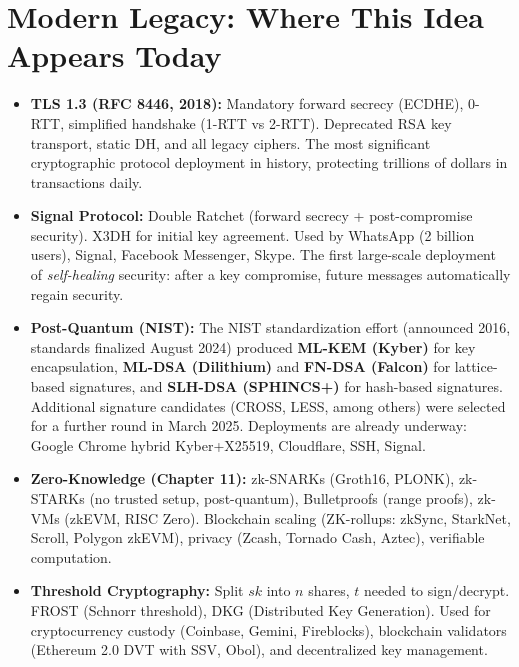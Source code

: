 \section{Modern Legacy: Where This Idea Appears Today}
\label{sec:crypto:legacy}

\begin{itemize}
\item \textbf{TLS 1.3 (RFC 8446, 2018):} Mandatory forward secrecy (ECDHE), 0-RTT, simplified handshake (1-RTT vs 2-RTT). Deprecated RSA key transport, static DH, and all legacy ciphers. The most significant cryptographic protocol deployment in history, protecting trillions of dollars in transactions daily.

\item \textbf{Signal Protocol:} Double Ratchet (forward secrecy + post-compromise security). X3DH for initial key agreement. Used by WhatsApp (2 billion users), Signal, Facebook Messenger, Skype. The first large-scale deployment of \emph{self-healing} security: after a key compromise, future messages automatically regain security.

\item \textbf{Post-Quantum (NIST):} The NIST standardization effort (announced 2016, standards finalized August 2024) produced \textbf{ML-KEM (Kyber)} for key encapsulation, \textbf{ML-DSA (Dilithium)} and \textbf{FN-DSA (Falcon)} for lattice-based signatures, and \textbf{SLH-DSA (SPHINCS+)} for hash-based signatures. Additional signature candidates (CROSS, LESS, among others) were selected for a further round in March 2025. Deployments are already underway: Google Chrome hybrid Kyber+X25519, Cloudflare, SSH, Signal.

\item \textbf{Zero-Knowledge (Chapter 11):} zk-SNARKs (Groth16, PLONK), zk-STARKs (no trusted setup, post-quantum), Bulletproofs (range proofs), zk-VMs (zkEVM, RISC Zero). Blockchain scaling (ZK-rollups: zkSync, StarkNet, Scroll, Polygon zkEVM), privacy (Zcash, Tornado Cash, Aztec), verifiable computation.

\item \textbf{Threshold Cryptography:} Split $sk$ into $n$ shares, $t$ needed to sign/decrypt. FROST (Schnorr threshold), DKG (Distributed Key Generation). Used for cryptocurrency custody (Coinbase, Gemini, Fireblocks), blockchain validators (Ethereum 2.0 DVT with SSV, Obol), and decentralized key management.


\end{itemize}
